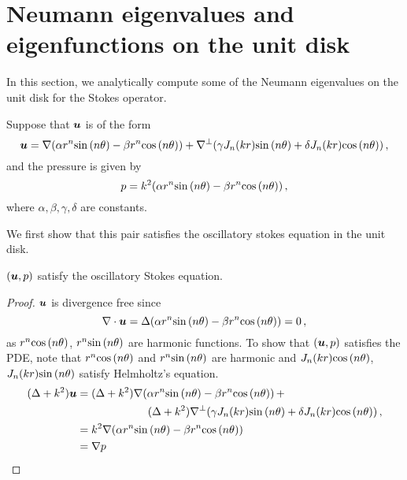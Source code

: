 \section{Neumann eigenvalues and eigenfunctions on the unit disk}
In this section, we analytically compute some of the Neumann eigenvalues
on the unit disk for the Stokes operator.

Suppose that ${\boldsymbol u}$ is of the form
\begin{equation}
{\boldsymbol u} = \nabla (\alpha r^{n} {\sin{(n \theta)}} - \beta r^{n} {\cos{(n \theta)}}) + \nabla^{\perp}(\gamma J_{n}(kr) {\sin{(n \theta)}} + \delta J_{n}(kr) {\cos{(n \theta)}}) \, ,
\end{equation}
and the pressure is given by
\begin{equation}
p = k^2 (\alpha r^{n} {\sin{(n \theta)}} - \beta r^{n} {\cos{(n \theta)}}) \, ,
\end{equation}
where $\alpha,\beta,\gamma,\delta$ are constants.

We first show that this pair satisfies the oscillatory stokes equation
in the unit disk.
\begin{lemma}
$({\boldsymbol u},p)$ satisfy the oscillatory Stokes equation.
\end{lemma}
\begin{proof}
${\boldsymbol u}$ is divergence free since
\begin{equation}
\nabla \cdot {\boldsymbol u}  = \Delta (\alpha r^{n} {\sin{(n \theta)}} - \beta r^{n} {\cos{(n \theta)}}) = 0 \, ,
\end{equation}
as $r^{n} {\cos{(n \theta)}}$,  $r^{n} {\sin{(n \theta)}}$ are harmonic functions. 
To show that $({\boldsymbol u},p)$ satisfies the PDE, note that
$r^{n} {\cos{(n \theta)}}$ and $r^{n} {\sin{(n \theta)}}$ are harmonic
and $J_{n}(kr) {\cos{(n \theta)}}$, $J_{n}(kr) {\sin{(n \theta)}}$ satisfy Helmholtz's equation.
\begin{equation}
\begin{aligned}
(\Delta + k^2) \bu &= (\Delta + k^2) \nabla (\alpha r^{n} \sint - \beta r^{n} \cost) \, + \\
\quad & \hspace*{15ex} (\Delta + k^2) \nabla^{\perp} (\gamma \jnkr \sint + \delta \jnkr \cost) \, , \\
&= k^2 \nabla (\alpha r^{n} \sint - \beta r^{n} \cost) \\ 
&= \nabla p
\end{aligned}
\end{equation}
\end{proof}

